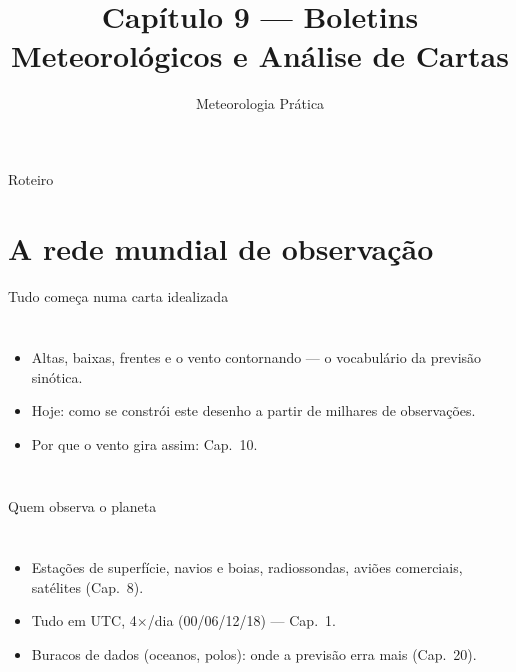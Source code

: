 \documentclass[aspectratio=169,11pt]{beamer}
\title[Cap. 9 --- Boletins e Cartas]{Capítulo 9 --- Boletins
Meteorológicos e Análise de Cartas}
\subtitle{Meteorologia Prática}
\author{}
\date{}
\begin{document}
\begin{frame}
  \titlepage
  \vfill
  \atribuicao
\end{frame}

\begin{frame}{Roteiro}
  \tableofcontents
\end{frame}

\section{A rede mundial de observação}

\begin{frame}{Tudo começa numa carta idealizada}
  \begin{columns}
    \begin{itemize}
      \item Altas, baixas, frentes e o vento contornando — o
            \alert{vocabulário} da previsão sinótica.
      \item Hoje: como se constrói este desenho a partir de milhares
            de observações.
      \item Por que o vento gira assim: Cap.~10.
    \end{itemize}
  \end{columns}
\end{frame}

\begin{frame}{Quem observa o planeta}
  \begin{columns}
    \begin{itemize}
      \item Estações de superfície, navios e boias, radiossondas,
            aviões comerciais, satélites (Cap.~8).
      \item Tudo em UTC, 4$\times$/dia (00/06/12/18) — Cap.~1.
      \item Buracos de dados (oceanos, polos): onde a previsão erra
            mais (Cap.~20).
    \end{itemize}
  \end{columns}
\end{frame}

\end{document}
